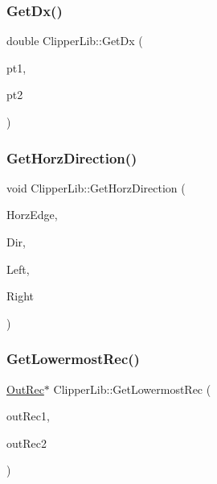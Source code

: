 \mbox{\label{namespace_clipper_lib_adb890cca4fa2a71731b91968cf4ff49d}} 
\subsubsection{\texorpdfstring{GetDx()}{GetDx()}}
{\footnotesize\ttfamily double Clipper\+Lib\+::\+Get\+Dx (\begin{DoxyParamCaption}\item[{const \mbox{\hyperlink{struct_clipper_lib_1_1_int_point}{Int\+Point}}}]{pt1,  }\item[{const \mbox{\hyperlink{struct_clipper_lib_1_1_int_point}{Int\+Point}}}]{pt2 }\end{DoxyParamCaption})\hspace{0.3cm}{\ttfamily [inline]}}

\mbox{\label{namespace_clipper_lib_a3a6a98076d47afe4c2e033833ae89bf5}} 
\subsubsection{\texorpdfstring{GetHorzDirection()}{GetHorzDirection()}}
{\footnotesize\ttfamily void Clipper\+Lib\+::\+Get\+Horz\+Direction (\begin{DoxyParamCaption}\item[{\mbox{\hyperlink{struct_clipper_lib_1_1_t_edge}{T\+Edge}} \&}]{Horz\+Edge,  }\item[{\mbox{\hyperlink{namespace_clipper_lib_a50027cc5a43f727ff89bcadf7e4524a7}{Direction}} \&}]{Dir,  }\item[{\mbox{\hyperlink{namespace_clipper_lib_a7156730a24951629192d4831334bafaa}{c\+Int}} \&}]{Left,  }\item[{\mbox{\hyperlink{namespace_clipper_lib_a7156730a24951629192d4831334bafaa}{c\+Int}} \&}]{Right }\end{DoxyParamCaption})}

\mbox{\label{namespace_clipper_lib_a4460fbf56cbd0c6b6928867a189b9c91}} 
\subsubsection{\texorpdfstring{GetLowermostRec()}{GetLowermostRec()}}
{\footnotesize\ttfamily \mbox{\hyperlink{struct_clipper_lib_1_1_out_rec}{Out\+Rec}}$\ast$ Clipper\+Lib\+::\+Get\+Lowermost\+Rec (\begin{DoxyParamCaption}\item[{\mbox{\hyperlink{struct_clipper_lib_1_1_out_rec}{Out\+Rec}} $\ast$}]{out\+Rec1,  }\item[{\mbox{\hyperlink{struct_clipper_lib_1_1_out_rec}{Out\+Rec}} $\ast$}]{out\+Rec2 }\end{DoxyParamCaption})}

